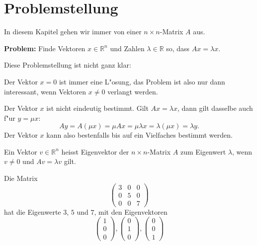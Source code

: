\section{Problemstellung}
In diesem Kapitel gehen wir immer von einer $n\times n$-Matrix $A$ aus.

\medskip
{\parindent0pt \bf Problem:} Finde Vektoren $x\in\mathbb R^n$ und
Zahlen $\lambda\in\mathbb R$ so, dass $Ax=\lambda x$.
\medskip

{\parindent0pt Diese Problemstellung ist nicht ganz klar:}
\begin{compactitem}
\item Der Vektor $x=0$ ist immer eine L"osung, das Problem ist also
nur dann interessant, wenn Vektoren $x\ne 0$ verlangt werden.
\item Der Vektor $x$ ist nicht eindeutig bestimmt. Gilt $Ax=\lambda x$,
dann gilt dasselbe auch f"ur $y=\mu x$:
\[
Ay= A(\mu x)=\mu Ax=\mu\lambda x = \lambda (\mu x)=\lambda y.
\]
Der Vektor $x$ kann also bestenfalls bis auf ein Vielfaches bestimmt werden.
\end{compactitem}

\begin{definition}
Ein Vektor $v \in \mathbb R^n$ heisst Eigenvektor der $n\times n$-Matrix $A$
zum Eigenwert $\lambda$, wenn $v\ne 0$ und $Av=\lambda v$ gilt.
\end{definition}

\begin{beispiel}
Die Matrix
\[
\begin{pmatrix}
3&0&0\\
0&5&0\\
0&0&7
\end{pmatrix}
\]
hat die Eigenwerte $3$, $5$ und $7$, mit den Eigenvektoren
\[
\begin{pmatrix}
1\\0\\0
\end{pmatrix}
,
\begin{pmatrix}
0\\1\\0
\end{pmatrix}
,
\begin{pmatrix}
0\\0\\1
\end{pmatrix}
\]
\end{beispiel}

